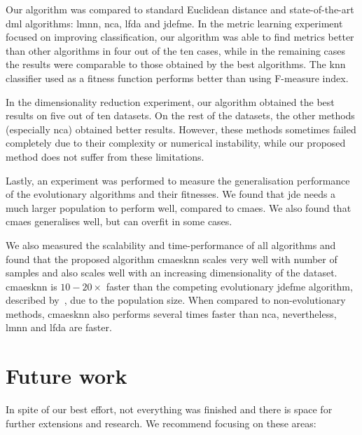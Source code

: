 \documentclass[12pt,a4paper]{report}
\begin{document}
Our algorithm was compared to standard Euclidean distance and state-of-the-art \ac{dml} algorithms: \ac{lmnn}, \ac{nca}, \ac{lfda} and \ac{jdefme}. In the metric learning experiment focused on improving classification, our algorithm was able to find metrics better than other algorithms in four out of the ten cases, while in the remaining cases the results were comparable to those obtained by the best algorithms. The \ac{knn} classifier used as a fitness function performs better than using \mbox{F-measure} index.

In the dimensionality reduction experiment, our algorithm obtained the best results on five out of ten datasets. On the rest of the datasets, the other methods (especially \ac{nca}) obtained better results. However, these methods sometimes failed completely due to their complexity or numerical instability, while our proposed method does not suffer from these limitations.

Lastly, an experiment was performed to measure the generalisation performance of the evolutionary algorithms and their fitnesses. We found that \ac{jde} needs a much larger population to perform well, compared to \ac{cmaes}. We also found that \ac{cmaes} generalises well, but can overfit in some cases. 

We also measured the scalability and time-performance of all algorithms and found that the proposed algorithm \ac{cmaesknn} scales very well with number of samples and also scales well with an increasing dimensionality of the dataset. \ac{cmaesknn} is $10-20\times$ faster than the competing evolutionary \ac{jdefme} algorithm, described by~\citep{fukui2013evolutionary}, due to the population size. When compared to non-evolutionary methods, \ac{cmaesknn} also performs several times faster than \ac{nca}, nevertheless, \ac{lmnn} and \ac{lfda} are faster.


\chapter{Future work} \label{chap:future-work}


In spite of our best effort, not everything was finished and there is space for further extensions and research. We recommend focusing on these areas:
\end{document}
